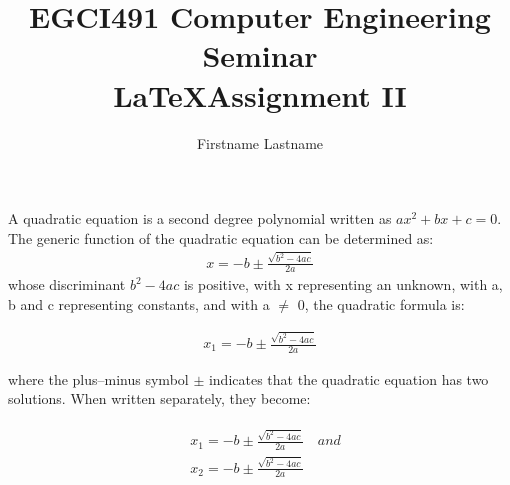 \documentclass[a4paper]{article} %
\title{EGCI491 Computer Engineering Seminar\\ \LaTeX \space Assignment II}
\author{Firstname Lastname}
\begin{document}
	\maketitle
	\noindent A quadratic equation is a second degree polynomial written as $ax^2+bx+c=0$. The generic function of the quadratic equation can be determined as:
	\begin{align}
		x=-b\pm\frac{\sqrt{b^2-4ac}}{2a}
	\end{align}
	\noindent whose discriminant $b^2-4ac$ is positive, with x representing an unknown, with a, b and c representing constants, and with a $\neq$ 0, the quadratic formula is:
	
	\begin{align}
		x_1=-b\pm\frac{\sqrt{b^2-4ac}}{2a}
	\end{align}
	
	\noindent where the plus–minus symbol $\pm$ indicates that the quadratic equation has two solutions. When written separately, they become:
	
	\begin{align}
		\begin{split}
			&x_1=-b\pm\frac{\sqrt{b^2-4ac}}{2a}\quad and\\
			&x_2=-b\pm\frac{\sqrt{b^2-4ac}}{2a}
		\end{split}
	\end{align}
	
\end{document}
